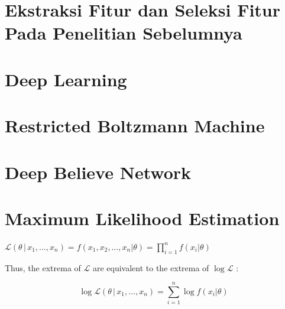 \section{Ekstraksi Fitur dan Seleksi Fitur Pada Penelitian Sebelumnya}


\section{Deep Learning}

\section{Restricted Boltzmann Machine}

\section{Deep Believe Network}

\section{Maximum Likelihood Estimation}
$    \mathcal{L}(\theta\,|\,x_1,\ldots,x_n) = f(x_1,x_2,\ldots,x_n|\theta) = \prod\limits_{i=1}^n f(x_i|\theta)  $

Thus, the extrema of $\mathcal{L}$  are equivalent to the extrema of $ \log \mathcal{L} $ :

   \begin{equation}
   \log \mathcal{L}(\theta\,|\,x_1,\ldots,x_n) = \sum\limits_{i=1}^n \log f(x_i|\theta) 
   \end{equation}

